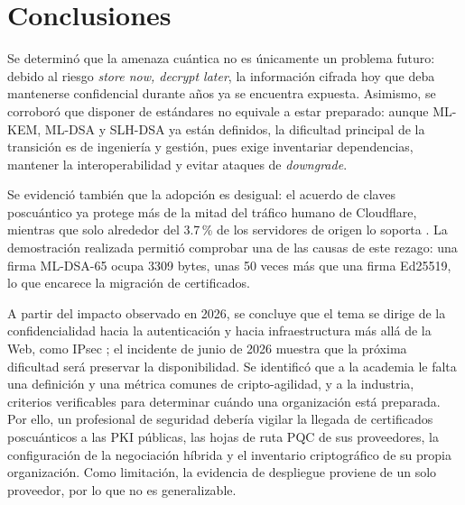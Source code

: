 \section{Conclusiones}
\label{sec:conclusiones}

Se determinó que la amenaza cuántica no es únicamente un problema futuro: debido al riesgo \textit{store now, decrypt later}, la información cifrada hoy que deba mantenerse confidencial durante años ya se encuentra expuesta. Asimismo, se corroboró que disponer de estándares no equivale a estar preparado: aunque ML-KEM, ML-DSA y SLH-DSA ya están definidos, la dificultad principal de la transición es de ingeniería y gestión, pues exige inventariar dependencias, mantener la interoperabilidad y evitar ataques de \textit{downgrade}.

Se evidenció también que la adopción es desigual: el acuerdo de claves poscuántico ya protege más de la mitad del tráfico humano de Cloudflare, mientras que solo alrededor del 3.7\,\% de los servidores de origen lo soporta \cite{westerbaan2025postquantum}. La demostración realizada permitió comprobar una de las causas de este rezago: una firma ML-DSA-65 ocupa 3309 bytes, unas 50 veces más que una firma Ed25519, lo que encarece la migración de certificados.

A partir del impacto observado en 2026, se concluye que el tema se dirige de la confidencialidad hacia la autenticación y hacia infraestructura más allá de la Web, como IPsec \cite{goldberg2026ipsec,valenta2026authentication}; el incidente de junio de 2026 muestra que la próxima dificultad será preservar la disponibilidad. Se identificó que a la academia le falta una definición y una métrica comunes de cripto-agilidad, y a la industria, criterios verificables para determinar cuándo una organización está preparada. Por ello, un profesional de seguridad debería vigilar la llegada de certificados poscuánticos a las PKI públicas, las hojas de ruta PQC de sus proveedores, la configuración de la negociación híbrida y el inventario criptográfico de su propia organización. Como limitación, la evidencia de despliegue proviene de un solo proveedor, por lo que no es generalizable.
